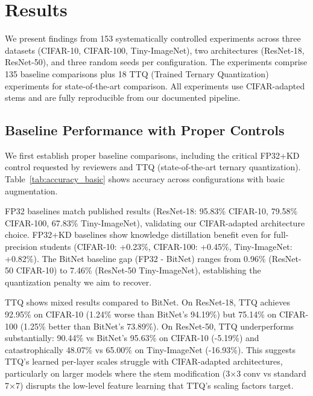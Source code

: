 
\section{Results}
\label{sec:results}

We present findings from 153 systematically controlled experiments across three datasets (CIFAR-10, CIFAR-100, Tiny-ImageNet), two architectures (ResNet-18, ResNet-50), and three random seeds per configuration. The experiments comprise 135 baseline comparisons plus 18 TTQ (Trained Ternary Quantization) experiments for state-of-the-art comparison. All experiments use CIFAR-adapted stems and are fully reproducible from our documented pipeline.

\subsection{Baseline Performance with Proper Controls}
\label{sec:results:baselines}

We first establish proper baseline comparisons, including the critical FP32+KD control requested by reviewers and TTQ (state-of-the-art ternary quantization). Table~\ref{tab:accuracy_basic} shows accuracy across configurations with basic augmentation.



FP32 baselines match published results (ResNet-18: 95.83\% CIFAR-10, 79.58\% CIFAR-100, 67.83\% Tiny-ImageNet), validating our CIFAR-adapted architecture choice. FP32+KD baselines show knowledge distillation benefit even for full-precision students (CIFAR-10: +0.23\%, CIFAR-100: +0.45\%, Tiny-ImageNet: +0.82\%). The BitNet baseline gap (FP32 - BitNet) ranges from 0.96\% (ResNet-50 CIFAR-10) to 7.46\% (ResNet-50 Tiny-ImageNet), establishing the quantization penalty we aim to recover.

TTQ shows mixed results compared to BitNet. On ResNet-18, TTQ achieves 92.95\% on CIFAR-10 (1.24\% worse than BitNet's 94.19\%) but 75.14\% on CIFAR-100 (1.25\% better than BitNet's 73.89\%). On ResNet-50, TTQ underperforms substantially: 90.44\% vs BitNet's 95.63\% on CIFAR-10 (-5.19\%) and catastrophically 48.07\% vs 65.00\% on Tiny-ImageNet (-16.93\%). This suggests TTQ's learned per-layer scales struggle with CIFAR-adapted architectures, particularly on larger models where the stem modification (3×3 conv vs standard 7×7) disrupts the low-level feature learning that TTQ's scaling factors target.

